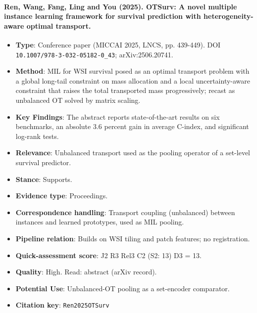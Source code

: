 \documentclass[journal,onecolumn]{IEEEtran}
\begin{document}
\paragraph{Ren, Wang, Fang, Ling and You (2025). OTSurv: A novel multiple instance learning framework for survival prediction with heterogeneity-aware optimal transport.~\cite{Ren2025OTSurv}}\mbox{}

\begin{itemize}

\item{} \textbf{Type}: Conference paper (MICCAI 2025, LNCS, pp. 439-449). DOI \nolinkurl{10.1007/978-3-032-05182-0_43}; arXiv:2506.20741.

\item{} \textbf{Method}: MIL for WSI survival posed as an optimal transport problem with a global long-tail constraint on mass allocation and a local uncertainty-aware constraint that raises the total transported mass progressively; recast as unbalanced OT solved by matrix scaling.

\item{} \textbf{Key Findings}: The abstract reports state-of-the-art results on six benchmarks, an absolute 3.6 percent gain in average C-index, and significant log-rank tests.

\item{} \textbf{Relevance}: Unbalanced transport used as the pooling operator of a set-level survival predictor.

\item{} \textbf{Stance}: Supports.

\item{} \textbf{Evidence type}: Proceedings.

\item{} \textbf{Correspondence handling}: Transport coupling (unbalanced) between instances and learned prototypes, used as MIL pooling.

\item{} \textbf{Pipeline relation}: Builds on WSI tiling and patch features; no registration.

\item{} \textbf{Quick-assessment score}: J2 R3 Rel3 C2 (S2: 13) D3 = 13.

\item{} \textbf{Quality}: High. Read: abstract (arXiv record).

\item{} \textbf{Potential Use}: Unbalanced-OT pooling as a set-encoder comparator.

\item{} \textbf{Citation key}: \texttt{Ren2025OTSurv}

\end{itemize}
\end{document}
